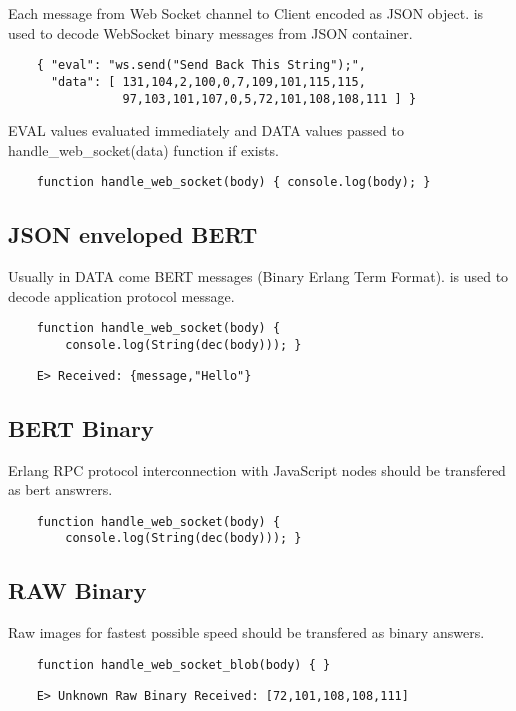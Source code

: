 Each message from Web Socket channel to Client encoded as JSON object.
is used to decode WebSocket binary messages from JSON container.

\begin{lstlisting}
    { "eval": "ws.send("Send Back This String");",
      "data": [ 131,104,2,100,0,7,109,101,115,115,
                97,103,101,107,0,5,72,101,108,108,111 ] }
\end{lstlisting}

EVAL values evaluated immediately and DATA values passed
to handle\_web\_socket(data) function if exists.

\begin{lstlisting}
    function handle_web_socket(body) { console.log(body); }
\end{lstlisting}

\subsection{JSON enveloped BERT}

Usually in DATA come BERT messages (Binary Erlang Term Format).
is used to decode application protocol message.

\begin{lstlisting}
    function handle_web_socket(body) {
        console.log(String(dec(body))); }
\end{lstlisting}

\begin{lstlisting}
    E> Received: {message,"Hello"}
\end{lstlisting}

\subsection{BERT Binary}

Erlang RPC protocol interconnection with JavaScript nodes should be transfered as bert answrers.

\begin{lstlisting}
    function handle_web_socket(body) {
        console.log(String(dec(body))); }
\end{lstlisting}

\subsection{RAW Binary}

Raw images for fastest possible speed should be transfered as binary answers.

\begin{lstlisting}
    function handle_web_socket_blob(body) { }
\end{lstlisting}

\begin{lstlisting}
    E> Unknown Raw Binary Received: [72,101,108,108,111]
\end{lstlisting}
